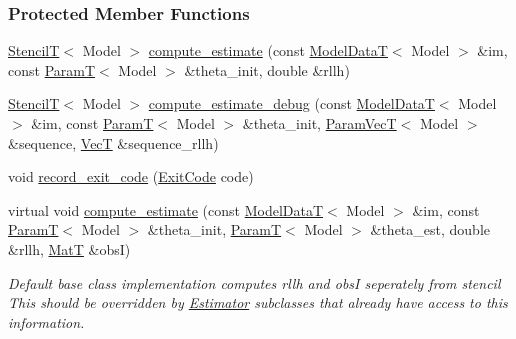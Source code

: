 \subsubsection*{Protected Member Functions}
\begin{DoxyCompactItemize}
\item 
\hyperlink{namespacemappel_a3a06598240007876f8c4bf834ad86197}{StencilT}$<$ Model $>$ \hyperlink{classmappel_1_1CGaussMLE_aa4e4761873c14cfe848f04ec8dc896d6}{compute\+\_\+estimate} (const \hyperlink{namespacemappel_a97f050df953605381ae9c901c3b125f1}{Model\+DataT}$<$ Model $>$ \&im, const \hyperlink{namespacemappel_a667925cb0d6c0e49f2f035cc5a9a6857}{ParamT}$<$ Model $>$ \&theta\+\_\+init, double \&rllh)
\item 
\hyperlink{namespacemappel_a3a06598240007876f8c4bf834ad86197}{StencilT}$<$ Model $>$ \hyperlink{classmappel_1_1CGaussMLE_a6bf98b8144f4cd5f548b49f32a95141e}{compute\+\_\+estimate\+\_\+debug} (const \hyperlink{namespacemappel_a97f050df953605381ae9c901c3b125f1}{Model\+DataT}$<$ Model $>$ \&im, const \hyperlink{namespacemappel_a667925cb0d6c0e49f2f035cc5a9a6857}{ParamT}$<$ Model $>$ \&theta\+\_\+init, \hyperlink{namespacemappel_a0f86d3153e4e27b095012f140eea58de}{Param\+VecT}$<$ Model $>$ \&sequence, \hyperlink{namespacemappel_a2225ad69f358daa3f4f99282a35b9a3a}{VecT} \&sequence\+\_\+rllh)
\item 
void \hyperlink{classmappel_1_1ThreadedEstimator_a8fefc448211f9caa3612ba4f34b006ab}{record\+\_\+exit\+\_\+code} (\hyperlink{classmappel_1_1Estimator_a6d599915907ba4d0607fcb958d231edc}{Exit\+Code} code)
\item 
virtual void \hyperlink{classmappel_1_1Estimator_aa46d86cfb5c336c9cb8c106da036d7d1}{compute\+\_\+estimate} (const \hyperlink{namespacemappel_a97f050df953605381ae9c901c3b125f1}{Model\+DataT}$<$ Model $>$ \&im, const \hyperlink{namespacemappel_a667925cb0d6c0e49f2f035cc5a9a6857}{ParamT}$<$ Model $>$ \&theta\+\_\+init, \hyperlink{namespacemappel_a667925cb0d6c0e49f2f035cc5a9a6857}{ParamT}$<$ Model $>$ \&theta\+\_\+est, double \&rllh, \hyperlink{namespacemappel_a7091ab87c528041f7e2027195fad8915}{MatT} \&obsI)
\begin{DoxyCompactList}\small\item\em Default base class implementation computes rllh and obsI seperately from stencil This should be overridden by \hyperlink{classmappel_1_1Estimator}{Estimator} subclasses that already have access to this information. \end{DoxyCompactList}\item 

\end{DoxyCompactItemize}
